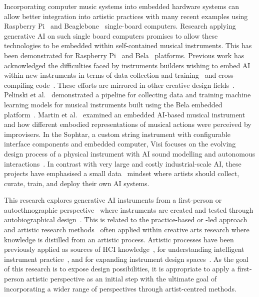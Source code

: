\documentclass[sigconf]{nimeart}
\begin{document}
Incorporating computer music systems into embedded hardware systems can allow better integration into artistic practices with many recent examples using Raspberry Pi~\cite{Berdahl:2013aa} and Beaglebone~\cite{mcpherson-bela-2016} single-board computers. 
Research applying generative AI on such single board computers promises to allow these technologies to be embedded within self-contained musical instruments. 
This has been demonstrated for Raspberry Pi~\cite{Naess:2019aa, martin_empi} and Bela~\cite{pelinski_pipeline_bela} platforms. 
Previous work has acknowledged the difficulties faced by instruments builders wishing to embed AI within new instruments in terms of data collection and training~\cite{Martin2019} and cross-compiling code~\cite{pelinski_pipeline_bela}. These efforts are mirrored in other creative design fields~\cite{teachablemachine}.
Pelinski et al.~\cite{pelinski_pipeline_bela} demonstrated a pipeline for collecting data and training machine learning models for musical instruments built using the Bela embedded platform~\cite{mcpherson-bela-2016}.
Martin et al.~\cite{martin_empi} examined an embedded AI-based musical instrument and how different embodied representations of musical actions were perceived by improvisers.
In the Sophtar, a custom string instrument with configurable interface components and embedded computer, Visi focuses on the evolving design process of a physical instrument with AI sound modelling and autonomous interactions~\cite{visi-sophtar-2024}.
In contrast with very large and costly industrial-scale AI, these projects have emphasised a small data~\cite{Vigliensoni:2022} mindset where artists should collect, curate, train, and deploy their own AI systems. 


This research explores generative AI instruments from a first-person or autoethnographic perspective~\cite{autoethnography-hci} where instruments are created and tested through autobiographical design~\cite{autobiographical-design}. 
This is related to the practice-based or -led approach~\cite{Smith:2009gf} and artistic research methods~\cite[e.g.,][]{bowers-room-feedback} often applied within creative arts research where knowledge is distilled from an artistic process. Artistic processes have been previously applied as sources of HCI knowledge~\cite{artistic-narratives-hci}, for understanding intelligent instrument practice~\cite{privato-hauntography-2024, stefansdottir_intelligent_2025}, and for expanding instrument design spaces~\cite{bowers-room-feedback}. As the goal of this research is to expose design possibilities, it is appropriate to apply a first-person artistic perspective as an initial step with the ultimate goal of incorporating a wider range of perspectives through artist-centred methods.
\end{document}
